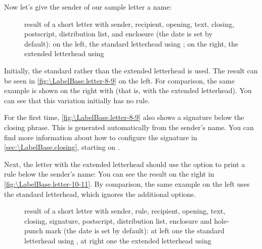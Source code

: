 \begin{Example}
  Now let's give the sender of our sample letter a name:
  \begin{figure}
    \centering
    \quad
    \caption[{Example: letter with sender, recipient, opening, text, closing,
      postscript, distribution list, and enclosure}]
    {result of a short letter with sender, recipient, opening, text, closing,
      postscript, distribution list, and enclosure (the date is set by
      default): on the left, the standard letterhead using
      ; on the right, the
      extended letterhead using }
    \label{fig:\LabelBase.letter-8-9}
  \end{figure}
  Initially, the standard rather than the extended letterhead is used. The
  result can be seen in \autoref{fig:\LabelBase.letter-8-9} on the left. For
  comparison, the same example is shown on the right with
   (that is, with the extended
  letterhead). You can see that this variation initially has no rule.

  For the first time, \autoref{fig:\LabelBase.letter-8-9} also shows a
  signature below the closing phrase. This is generated automatically from the
  sender's name. You can find more information about how to configure the
  signature in \autoref{sec:\LabelBase.closing}, starting on
  .

  Next, the letter with the extended letterhead should use the
   option to print a rule below the sender's name:%
  You can see the result on the right in
  \autoref{fig:\LabelBase.letter-10-11}. By comparison, the same example on
  the left uses the standard letterhead, which ignores the additional options.
  \begin{figure}
    \centering
    \quad
    \caption[{Example: letter with sender, rule, recipient,
      opening, text, closing, signature, postscript, distribution list,
      enclosure, and hole-punch mark}]
    {result of a short letter with sender, rule, recipient,
      opening, text, closing, signature, postscript, distribution list,
      enclosure and hole-punch mark (the date is set by default):
      at left one the standard letterhead using
      , at right one the extended letterhead
      using }
    \label{fig:\LabelBase.letter-10-11}
  \end{figure}
\end{Example}

